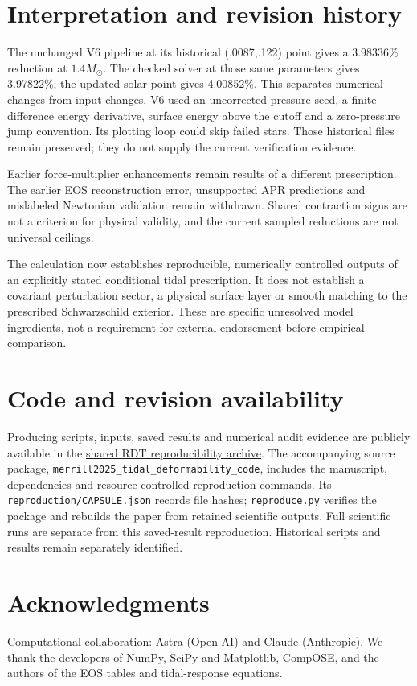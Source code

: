 \documentclass[twocolumn,prd,superscriptaddress,nofootinbib]{revtex4-2}
\begin{document}
\section{Interpretation and revision history}
The unchanged V6 pipeline at its historical (.0087,.122) point gives a
3.98336\% reduction at $1.4M_\odot$. The checked solver at those same
parameters gives 3.97822\%; the updated solar point gives 4.00852\%.
This separates numerical changes from input changes. V6 used an
uncorrected pressure seed, a finite-difference energy derivative, surface
energy above the cutoff and a zero-pressure jump convention. Its plotting
loop could skip failed stars. Those historical files remain preserved;
they do not supply the current verification evidence.

Earlier force-multiplier enhancements remain results of a different
prescription. The earlier EOS reconstruction error, unsupported APR
predictions and mislabeled Newtonian validation remain withdrawn. Shared
contraction signs are not a criterion for physical validity, and the
current sampled reductions are not universal ceilings.

The calculation now establishes reproducible, numerically controlled
outputs of an explicitly stated conditional tidal prescription. It does
not establish a covariant perturbation sector, a physical surface layer or
smooth matching to the prescribed Schwarzschild exterior. These are
specific unresolved model ingredients, not a requirement for external
endorsement before empirical comparison.

\section*{Code and revision availability}
Producing scripts, inputs, saved results and numerical audit evidence are
publicly available in the \href{https://github.com/chrismerrill1974/solarcore_code/tree/main/reproduction}{shared RDT reproducibility archive}.
The accompanying source package, \nolinkurl{merrill2025_tidal_deformability_code}, includes the
manuscript, dependencies and resource-controlled reproduction commands.
Its \texttt{reproduction/CAPSULE.json} records file hashes;
\texttt{reproduce.py} verifies the package and rebuilds the paper from retained
scientific outputs. Full scientific runs are separate from this saved-result
reproduction. Historical scripts and results remain separately identified.

\section*{Acknowledgments}
Computational collaboration: Astra (Open AI) and Claude (Anthropic).
We thank the developers of NumPy, SciPy and Matplotlib, CompOSE, and the
authors of the EOS tables and tidal-response equations.
\end{document}
